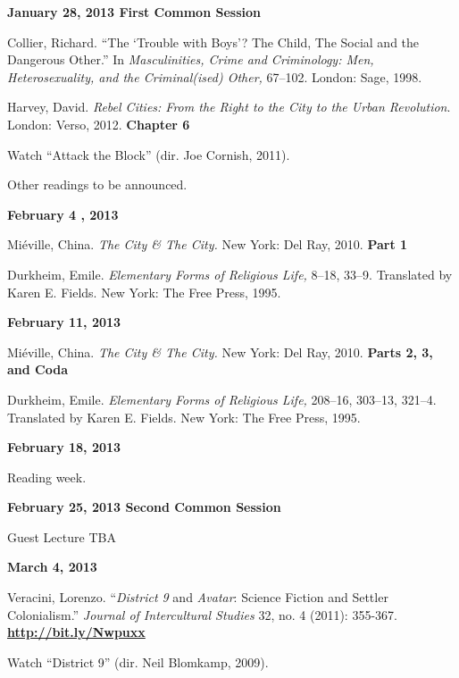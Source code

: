 \documentclass[12pt]{article}
\begin{document}
\textbf{January 28, 2013 \hspace{.125in} First Common Session}

\begin{hangparas}{.5in}{1}
Collier, Richard. ``The `Trouble with Boys'? The Child, The Social and the Dangerous Other.'' In \textit{Masculinities, Crime and Criminology: Men, Heterosexuality, and the Criminal(ised) Other,} 67--102. London: Sage, 1998.

Harvey, David. \textit{Rebel Cities: From the Right to the City to the Urban Revolution}. London: Verso, 2012. \textbf{Chapter 6}

Watch ``Attack the Block'' (dir. Joe Cornish, 2011).

Other readings to be announced.
\end{hangparas}

\textbf{February 4 , 2013}

\begin{hangparas}{.5in}{1}
Mi\'eville, China. \textit{The City \& The City.} New York: Del Ray, 2010. \textbf{Part 1}

Durkheim, Emile. \textit{Elementary Forms of Religious Life,} 8--18, 33--9. Translated by Karen E. Fields. New York: The Free Press, 1995.
\end{hangparas}

\newpage

\textbf{February 11, 2013}

\begin{hangparas}{.5in}{1}
Mi\'eville, China. \textit{The City \& The City.} New York: Del Ray, 2010. \textbf{Parts 2, 3, and Coda}

Durkheim, Emile. \textit{Elementary Forms of Religious Life,} 208--16, 303--13, 321--4. Translated by Karen E. Fields. New York: The Free Press, 1995.
\end{hangparas}

\textbf{February 18, 2013}

Reading week.

\textbf{February 25, 2013 \hspace{.125in} Second Common Session}

Guest Lecture TBA

\textbf{March 4, 2013}

\begin{hangparas}{.5in}{1}
Veracini, Lorenzo. ``\textit{District 9} and \textit{Avatar}: Science Fiction and Settler Colonialism.'' \textit{Journal of Intercultural Studies} 32, no. 4 (2011): 355-367. \href{http://bit.ly/Nwpuxx}{\textbf{http://bit.ly/Nwpuxx}}

Watch ``District 9'' (dir. Neil Blomkamp, 2009).
\end{hangparas}
\end{document}
